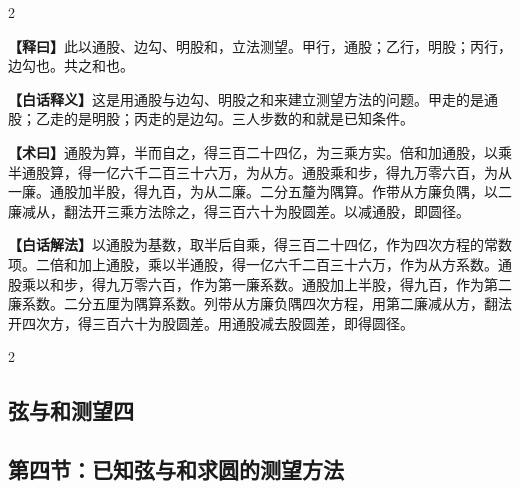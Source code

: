 \documentclass[11pt,a4paper]{article}
\newcommand{\WenExplain}{\textcolor{classicalcolor}{\textbf{【释曰】}}}
\newcommand{\BaiExplain}{\textcolor{moderncolor}{\textbf{【白话释义】}}}
\newcommand{\WenMethod}{\textcolor{classicalcolor}{\textbf{【术曰】}}}
\newcommand{\BaiMethod}{\textcolor{moderncolor}{\textbf{【白话解法】}}}
\begin{document}
\begin{paracol}{2}
\switchcolumn*
\begin{tcolorbox}[colback=red!5,colframe=red!30!black,boxrule=0.3pt]
\WenExplain\quad 此以通股、边勾、明股和，立法测望。甲行，通股；乙行，明股；丙行，边勾也。共之和也。
\end{tcolorbox}
\switchcolumn
\begin{tcolorbox}[colback=blue!5,colframe=blue!30!black,boxrule=0.3pt]
\BaiExplain\quad 这是用通股与边勾、明股之和来建立测望方法的问题。甲走的是通股；乙走的是明股；丙走的是边勾。三人步数的和就是已知条件。
\end{tcolorbox}

\switchcolumn*
\begin{tcolorbox}[colback=red!5,colframe=red!40!black,boxrule=0.3pt]
\WenMethod\quad 通股为算，半而自之，得三百二十四亿，为三乘方实。倍和加通股，以乘半通股算，得一亿六千二百三十六万，为从方。通股乘和步，得九万零六百，为从一廉。通股加半股，得九百，为从二廉。二分五釐为隅算。作带从方廉负隅，以二廉减从，翻法开三乘方法除之，得三百六十为股圆差。以减通股，即圆径。
\end{tcolorbox}
\switchcolumn
\begin{tcolorbox}[colback=blue!5,colframe=blue!40!black,boxrule=0.3pt]
\BaiMethod\quad 以通股为基数，取半后自乘，得三百二十四亿，作为四次方程的常数项。二倍和加上通股，乘以半通股，得一亿六千二百三十六万，作为从方系数。通股乘以和步，得九万零六百，作为第一廉系数。通股加上半股，得九百，作为第二廉系数。二分五厘为隅算系数。列带从方廉负隅四次方程，用第二廉减从方，翻法开四次方，得三百六十为股圆差。用通股减去股圆差，即得圆径。
\end{tcolorbox}

\end{paracol}

\vspace{0.5em}

\begin{paracol}{2}
\subsection*{\textcolor{sectioncolor}{弦与和测望四}}
\switchcolumn
\subsection*{\textcolor{sectioncolor}{第四节：已知弦与和求圆的测望方法}}
\end{paracol}

\vspace{0.5em}
\end{document}
